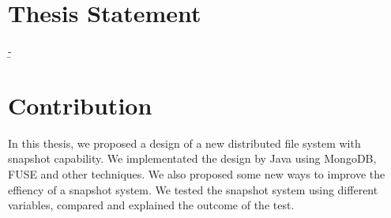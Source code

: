\section{Thesis Statement}
   \b{-} 

\section{Contribution}

    In this thesis, we proposed a design of a new distributed file system with snapshot capability. We implementated the design by Java using MongoDB, FUSE and other techniques. We also proposed some new ways to improve the effiency of a snapshot system. We tested the snapshot system using different variables, compared and explained the outcome of the test.
